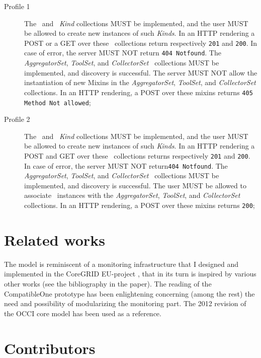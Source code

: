 \documentclass[12pt]{article}  %
\begin{document}
{\begin{description}
\item[Profile 1] The \coll\ and \sens\ {\em Kind} collections MUST be implemented, and the user MUST be allowed to create new instances of such {\em Kinds}.  In an HTTP rendering a POST or a GET over these \rs\ collections return respectively {\tt 201} and {\tt 200}. In case of error, the server MUST NOT return {\tt 404 Notfound}. The {\em AggregatorSet}, {\em ToolSet}, and {\em CollectorSet} \mi\ collections MUST be implemented, and discovery is successful. The server MUST NOT allow the instantiation of new Mixins in the {\em AggregatorSet}, {\em ToolSet}, and {\em CollectorSet} collections. In an HTTP rendering, a POST over these mixins returns {\tt 405 Method Not allowed}; 

\item[Profile 2]  The \coll\ and \sens\ {\em Kind} collections MUST be implemented, and the user MUST be allowed to create new instances of such {\em Kinds}.  In an HTTP rendering a POST and GET over these \rs\ collections returns respectively {\tt 201} and {\tt 200}. In case of error, the server MUST NOT return{\tt 404 Notfound}. The {\em AggregatorSet}, {\em ToolSet}, and {\em CollectorSet} \mi\ collections MUST be implemented, and discovery is successful. The user MUST be allowed to associate \mi\ instances with the  {\em AggregatorSet}, {\em ToolSet}, and {\em CollectorSet} collections. In an HTTP rendering, a POST over these mixins returns {\tt 200};

\end{description}

\section{Related works}

The model is reminiscent of a monitoring infrastructure that I designed and implemented in the CoreGRID EU-project \cite{cur:08:a}, that in its turn is inspired by various other works (see the bibliography in the paper). The reading of the CompatibleOne prototype \cite{mar12a} has been enlightening concerning (among the rest) the need and possibility of modularizing the monitoring part. The 2012 revision of the OCCI core model \cite{occi:core} has been used as a reference.





\section{Contributors}

}
\end{document}

